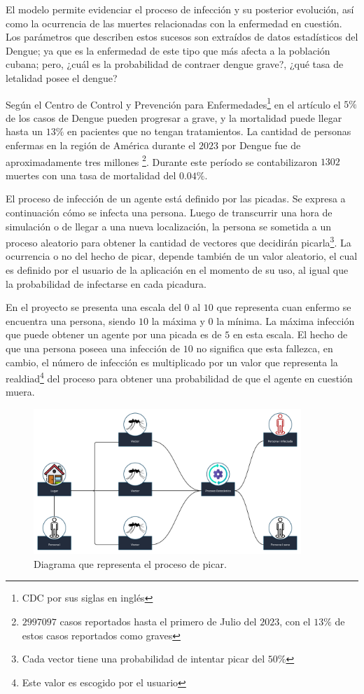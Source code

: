El modelo permite evidenciar el proceso de infección y su posterior evolución, así como la ocurrencia de 
las muertes relacionadas con la enfermedad en cuestión. Los parámetros que describen estos sucesos son 
extraídos de datos estadísticos del Dengue; ya que es la enfermedad de este tipo que más afecta a la población 
cubana; pero, ¿cuál es la probabilidad de contraer dengue grave?, ¿qué tasa de letalidad posee el dengue?

Según el Centro de Control y Prevención para Enfermedades\footnote{CDC por sus siglas en inglés} en el artículo 
\autocite{CDC2022} el $5\%$ de los casos de Dengue pueden progresar a grave, y la mortalidad puede llegar
hasta un $13\%$ en pacientes que no tengan tratamientos. La cantidad de personas enfermas en la región de América
durante el $2023$ por Dengue fue de aproximadamente tres millones \footnote{$2997097$ casos reportados hasta el primero
de Julio del $2023$, con el $13\%$ de estos casos reportados como graves}\autocite{WHO2023S}. Durante este 
período se contabilizaron $1302$ muertes con una tasa de mortalidad del $0.04\%$.

El proceso de infección de un agente está definido por las picadas. Se expresa a continuación
cómo se infecta una persona. Luego de transcurrir una hora de simulación
o de llegar a una nueva localización, la persona se sometida a un proceso aleatorio para obtener la 
cantidad de vectores que decidirán picarla\footnote{Cada vector tiene una probabilidad de intentar 
picar del $50\%$}. La ocurrencia o no del hecho de picar, depende también de un valor aleatorio, el cual es 
definido por el usuario de la aplicación en el momento de su uso, al igual que la probabilidad de infectarse
en cada picadura.

En el proyecto se presenta una escala del $0$ al $10$ que representa cuan enfermo se encuentra una persona, siendo
$10$ la máxima y $0$ la mínima. La máxima infección que puede obtener un agente por una picada es de $5$ en esta 
escala. El hecho de que una persona poseea una infección de $10$ no significa que esta fallezca, en cambio,
el número de infección es multiplicado por un valor que representa la realdiad\footnote{Este valor es escogido 
por el usuario} del proceso para obtener una probabilidad de que el agente en cuestión muera.

\begin{figure}[htb]
    \centering
    \includegraphics[width=0.9\textwidth]{Graphics/Grafico_Proceso_Picada.jpg}
    \caption{Diagrama que representa el proceso de picar.}
\end{figure}

